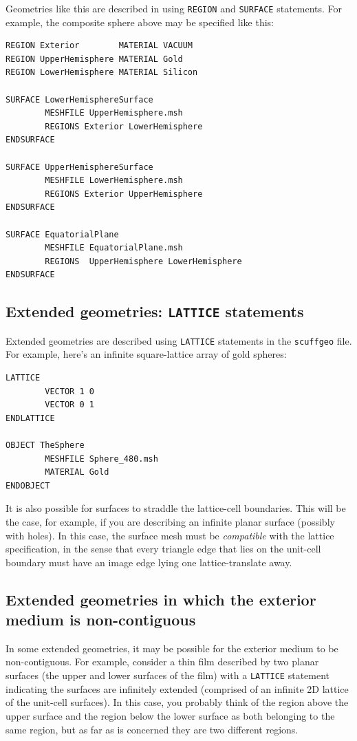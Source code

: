 \documentclass[letterpaper]{article}
\begin{document}
Geometries like this are described in \lss
using \texttt{REGION} and \texttt{SURFACE}
statements. For example, the composite sphere
above may be specified like this:
%
\begin{verbatim} 
REGION Exterior        MATERIAL VACUUM
REGION UpperHemisphere MATERIAL Gold
REGION LowerHemisphere MATERIAL Silicon

SURFACE LowerHemisphereSurface 
        MESHFILE UpperHemisphere.msh
        REGIONS Exterior LowerHemisphere
ENDSURFACE

SURFACE UpperHemisphereSurface 
        MESHFILE LowerHemisphere.msh
        REGIONS Exterior UpperHemisphere
ENDSURFACE

SURFACE EquatorialPlane
        MESHFILE EquatorialPlane.msh
        REGIONS  UpperHemisphere LowerHemisphere
ENDSURFACE
\end{verbatim} 
%
\subsection*{Extended geometries: \texttt{LATTICE}
             statements}

Extended geometries are described using \texttt{LATTICE}
statements in the \texttt{scuffgeo} file.
For example, here's an infinite square-lattice array 
of gold spheres:
%
\begin{verbatim}
LATTICE
        VECTOR 1 0 
        VECTOR 0 1 
ENDLATTICE

OBJECT TheSphere
        MESHFILE Sphere_480.msh
        MATERIAL Gold
ENDOBJECT
\end{verbatim}
%

It is also possible for surfaces to straddle 
the lattice-cell boundaries. This will be the 
case, for example, if you are describing an
infinite planar surface (possibly with
holes). In this case, the surface mesh must
be \textit{compatible} with the lattice specification,
in the sense that every triangle edge that 
lies on the unit-cell boundary must have an
image edge lying one lattice-translate away.

\subsection*{Extended geometries in which the exterior medium
             is non-contiguous}

In some extended geometries, it may be possible for the 
exterior medium to be non-contiguous. For example,
consider a thin film described by two planar surfaces  
(the upper and lower surfaces of the film) with a
\texttt{LATTICE} statement indicating the surfaces
are infinitely extended (comprised of an infinite
2D lattice of the unit-cell surfaces).
In this case, you probably think of the region above the 
upper surface and the region below the lower surface as 
both belonging to the same region, but as far as 
\lss is concerned they are two different regions.
\end{document}

